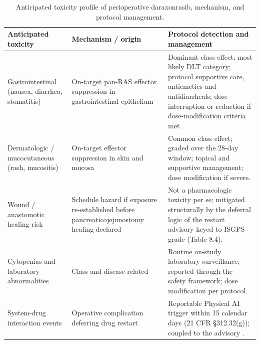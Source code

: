 \begin{table}[t]
\centering
\caption{Anticipated toxicity profile of perioperative daraxonrasib, mechanism,
and protocol management.}
\label{tab:sec07-toxprofile}
\begin{tabularx}{\textwidth}{L{3.2cm} L{4.6cm} Y}
\toprule
\textbf{Anticipated toxicity} & \textbf{Mechanism / origin} & \textbf{Protocol detection and management} \\
\midrule
Gastrointestinal (nausea, diarrhea, stomatitis) & On-target pan-RAS effector suppression in gastrointestinal epithelium & Dominant class effect; most likely DLT category; protocol supportive care, antiemetics and antidiarrheals; dose interruption or reduction if dose-modification criteria met \cite{onpremwhippl}. \\
Dermatologic / mucocutaneous (rash, mucositis) & On-target effector suppression in skin and mucosa & Common class effect; graded over the 28-day window; topical and supportive management; dose modification if severe. \\
Wound / anastomotic healing risk & Schedule hazard if exposure re-established before pancreaticojejunostomy healing declared & Not a pharmacologic toxicity per se; mitigated structurally by the deferral logic of the restart advisory keyed to ISGPS grade (Table 8.4). \\
Cytopenias and laboratory abnormalities & Class and disease-related & Routine on-study laboratory surveillance; reported through the safety framework; dose modification per protocol. \\
System-drug interaction events & Operative complication deferring drug restart & Reportable Physical AI trigger within 15 calendar days (21 CFR \S 312.32(g)); coupled to the advisory \cite{cfr312paiuni}. \\
\bottomrule
\end{tabularx}
\end{table}
\vspace*{-1.35cm}

